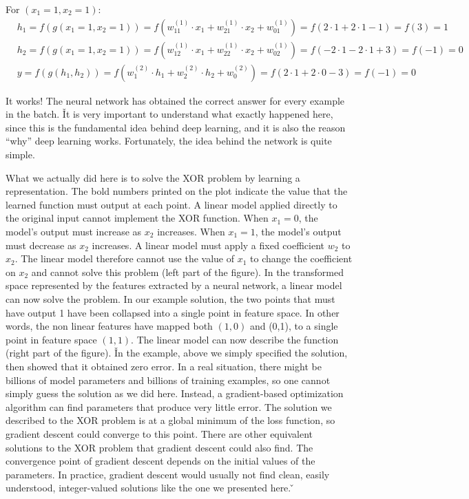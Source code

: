 \item For $(x_1 = 1, x_2 = 1)$:
\begin{align*}
&h_1 = f(g(x_1 = 1, x_2 = 1)) = f(w^{(1)}_{11} \cdot x_1 +
w^{(1)}_{21} \cdot x_2 + w^{(1)}_{01}) = f(2 \cdot 1 + 2 \cdot 1 - 1) = f(3) = 1 \\
&h_2 = f(g(x_1 = 1, x_2 = 1)) = f(w^{(1)}_{12} \cdot x_1 +
w^{(1)}_{22} \cdot x_2 + w^{(1)}_{02}) = f(-2 \cdot 1 - 2 \cdot 1 + 3) = f(-1) = 0 \\
&y = f(g(h_1, h_2)) = f(w^{(2)}_{1} \cdot h_1
+ w^{(2)}_{2} \cdot h_2 + w_{0}^{(2)}) = f(2 \cdot 1 + 2 \cdot 0 - 3) = f(-1) = 0
\end{align*}
\eit

It works! The neural network has obtained the correct answer for every example in the batch. \v

It is very important to understand what exactly happened here, since this is the fundamental idea behind deep
learning, and it is also the reason ``why'' deep learning works. Fortunately, the idea behind the network is quite
simple.

\vspace{-5pt}


\vspace{-8pt}

What we actually did here is to solve the XOR problem by learning a representation. The bold numbers printed on the
plot indicate the value that the learned function must output at each point. A linear model applied directly to the
original input cannot implement the XOR function. When $x_1 = 0$, the model's output must increase as $x_2$ increases.
When $x_1 = 1$, the model's output must decrease as $x_2$ increases. A linear model must apply a fixed coefficient
$w_2$ to $x_2$. The linear model therefore cannot use the value of $x_1$ to change the coefficient on $x_2$ and
cannot solve this problem (left part of the figure). In the transformed space represented by the features extracted
by a neural network, a linear model can now solve the problem. In our example solution, the two points that must have
output 1 have been collapsed into a single point in feature space. In other words, the non linear features have
mapped both $(1, 0)$ and (0,1), to a single point in feature space $(1,1)$. The linear model can now describe the
function (right part of the figure). \v

In the example, above we simply specified the solution, then showed that it obtained zero error. In a real situation,
there might be billions of model parameters and billions of training examples, so one cannot simply guess the
solution as we did here. Instead, a gradient-based optimization algorithm can find parameters that produce very
little error. The solution we described to the XOR problem is at a global minimum of the loss function, so gradient
descent could converge to this point. There are other equivalent solutions to the XOR problem that gradient descent
could also find. The convergence point of gradient descent depends on the initial values of the parameters. In
practice, gradient descent would usually not find clean, easily understood, integer-valued solutions like the one we
presented here. \v

